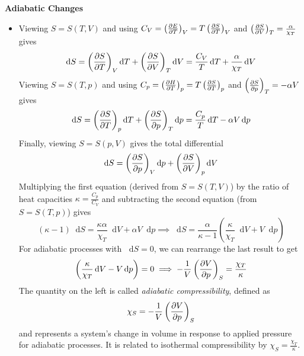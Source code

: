 \documentclass[11pt, a4paper]{article}
\newcommand{\diff}{\mathop{}\!\mathrm{d}} %
\newcommand{\pdveval}[3]{\left(\pdv{#1}{#2}\right)_{#3}}
\begin{document}
\vspace{-2mm}
\textbf{Adiabatic Changes}
\begin{itemize}
	\item Viewing $ S = S(T, V) $ and using $ C_{V} = \pdveval{E}{T}{V} = T\pdveval{S}{T}{V} $ and $ \pdveval{S}{V}{T} = \frac{\alpha}{\chi_{T}} $ gives
	\begin{equation*}
		\diff S = \pdveval{S}{T}{V}\diff T + \pdveval{S}{V}{T}\diff V = \frac{C_{V}}{T}\diff T + \frac{\alpha}{\chi_{T}}\diff V
	\end{equation*}
	Viewing $ S = S(T, p) $ and using $ C_{p} = \pdveval{H}{T}{p} = T\pdveval{S}{T}{p} $ and $ \pdveval{S}{p}{T} = - \alpha V $ gives
	\begin{equation*}
		\diff S = \pdveval{S}{T}{p}\diff T + \pdveval{S}{p}{T}\diff p = \frac{C_{p}}{T}\diff T - \alpha V\diff p
	\end{equation*}
	Finally, viewing $ S = S(p, V) $ gives the total differential
	\begin{equation*}
		\diff S = \pdveval{S}{p}{V} \diff p + \pdveval{S}{V}{p} \diff V
	\end{equation*}
	Multiplying the first equation (derived from $ S = S(T, V) $) by the ratio of heat capacities $ \kappa = \frac{C_{p}}{C_{V}} $ and subtracting the second equation (from $ S = S(T, p) $) gives
	\begin{equation*}
		(\kappa - 1) \diff S = \frac{\kappa \alpha}{\chi_{T}} \diff V + \alpha V \diff p \implies \diff S = \frac{\alpha}{\kappa - 1}\left(\frac{\kappa}{\chi_{T}}\diff V + V \diff p \right)
	\end{equation*}
	For adiabatic processes with $ \diff S = 0 $, we can rearrange the last result to get
	\begin{equation*}
		\left(\frac{\kappa}{\chi_{T}}\diff V - V \diff p\right) = 0 \implies - \frac{1}{V}\pdveval{V}{p}{S} = \frac{\chi_{T}}{\kappa}
	\end{equation*}
	The quantity on the left is called \textit{adiabatic compressibility}, defined as
	\begin{equation*}
		\chi_{S} = - \frac{1}{V}\pdveval{V}{p}{S}
	\end{equation*}
	and represents a system's change in volume in response to applied pressure for adiabatic processes. It is related to isothermal compressibility by $ \chi_{S} = \frac{\chi_{T}}{\kappa}$.
\end{itemize}	
\end{document}
